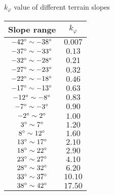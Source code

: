 \begin{center}
    \begin{threeparttable}
        \caption{$k_{\varphi}$ value of different terrain slopes}
        \begin{tabular}{cc}
            \hline
            Slope range & $k_{\varphi}$\\
            \hline
            $-42\degree \sim -38\degree$ & $0.007$\\
            $-37\degree \sim -33\degree$ & $0.13$\\
            $-32\degree \sim -28\degree$ & $0.21$\\
            $-27\degree \sim -23\degree$ & $0.32$\\
            $-22\degree \sim -18\degree$ & $0.46$\\
            $-17\degree \sim -13\degree$ & $0.63$\\
            $-12\degree \sim -8\degree$ & $0.83$\\
            $-7\degree \sim -3\degree$ & $0.90$\\
            $-2\degree \sim 2\degree$ & $1.00$\\
            $3\degree \sim 7\degree$ & $1.20$\\
            $8\degree \sim 12\degree$ & $1.60$\\
            $13\degree \sim 17\degree$ & $2.10$\\
            $18\degree \sim 22\degree$ & $2.90$\\
            $23\degree \sim 27\degree$ & $4.10$\\
            $28\degree \sim 32\degree$ & $6.20$\\
            $33\degree \sim 37\degree$ & $10.10$\\
            $38\degree \sim 42\degree$ & $17.50$\\
            \hline
        \end{tabular}
        \label{tab:kphi}
    \end{threeparttable}

\end{center}
